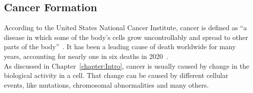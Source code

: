 \subsection{Cancer Formation}\label{subsec:cf_cancer_formation}
According to the United States National Cancer Institute, cancer is defined as ``a disease in which some of the body's cells grow uncontrollably and spread to other parts of the body''~\cite{nci_definition_cancer}. It has been a leading cause of death worldwide for many years, accounting for nearly one in six deaths in 2020~\cite{who-cancer}.\\
As discussed in Chapter~\ref{chapter:Intro}, cancer is usually caused by change in the biological activity in a cell. That change can be caused by different cellular events, like mutations, chromosomal abnormalities and many others.\\
